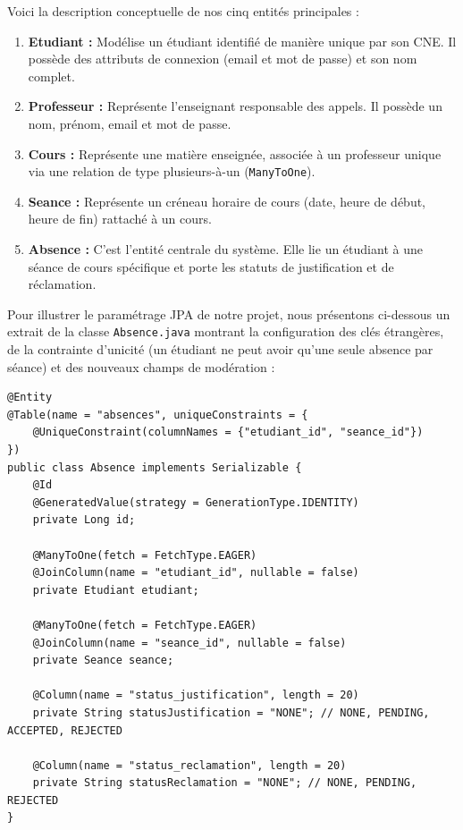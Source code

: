 \documentclass[12pt,a4paper]{article}
\begin{document}
Voici la description conceptuelle de nos cinq entités principales :
\begin{enumerate}
    \item \textbf{Etudiant :} Modélise un étudiant identifié de manière unique par son CNE. Il possède des attributs de connexion (email et mot de passe) et son nom complet.
    \item \textbf{Professeur :} Représente l'enseignant responsable des appels. Il possède un nom, prénom, email et mot de passe.
    \item \textbf{Cours :} Représente une matière enseignée, associée à un professeur unique via une relation de type plusieurs-à-un (\texttt{ManyToOne}).
    \item \textbf{Seance :} Représente un créneau horaire de cours (date, heure de début, heure de fin) rattaché à un cours.
    \item \textbf{Absence :} C'est l'entité centrale du système. Elle lie un étudiant à une séance de cours spécifique et porte les statuts de justification et de réclamation.
\end{enumerate}

Pour illustrer le paramétrage JPA de notre projet, nous présentons ci-dessous un extrait de la classe \texttt{Absence.java} montrant la configuration des clés étrangères, de la contrainte d'unicité (un étudiant ne peut avoir qu'une seule absence par séance) et des nouveaux champs de modération :

\begin{lstlisting}[caption={Extrait JPA de la classe Absence.java}]
@Entity
@Table(name = "absences", uniqueConstraints = {
    @UniqueConstraint(columnNames = {"etudiant_id", "seance_id"})
})
public class Absence implements Serializable {
    @Id
    @GeneratedValue(strategy = GenerationType.IDENTITY)
    private Long id;

    @ManyToOne(fetch = FetchType.EAGER)
    @JoinColumn(name = "etudiant_id", nullable = false)
    private Etudiant etudiant;

    @ManyToOne(fetch = FetchType.EAGER)
    @JoinColumn(name = "seance_id", nullable = false)
    private Seance seance;

    @Column(name = "status_justification", length = 20)
    private String statusJustification = "NONE"; // NONE, PENDING, ACCEPTED, REJECTED

    @Column(name = "status_reclamation", length = 20)
    private String statusReclamation = "NONE"; // NONE, PENDING, REJECTED
}
\end{lstlisting}
\end{document}
